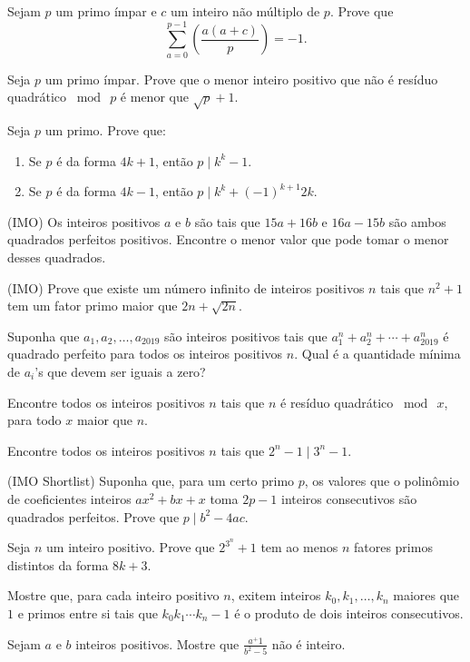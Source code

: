\documentclass[10pt,a4paper]{article}
\newcommand{\leg}[2]{\left(\frac{#1}{#2}\right)}
\newcommand{\tmod}[1]{\bmod{\ #1}}
\begin{document}
	\begin{prob}
		Sejam $p$ um primo ímpar e $c$ um inteiro não múltiplo de $p$. Prove que
		$$\sum_{a = 0}^{p-1}\leg{a(a+c)}{p} = -1.$$
	\end{prob}
	\begin{prob}
		Seja $p$ um primo ímpar. Prove que o menor inteiro positivo que não é resíduo quadrático $\tmod{p}$ é menor que $\sqrt{p} + 1$.
	\end{prob}
	\begin{prob}
		Seja $p$ um primo. Prove que:
		\begin{enumerate}[label = (\alph*)]
			\item Se $p$ é da forma $4k+1$, então $p \mid k^k - 1$.
			\item Se $p$ é da forma $4k-1$, então $p \mid k^k + (-1)^{k+1}2k$.
		\end{enumerate}
	\end{prob}
	\begin{prob}(IMO)
		Os inteiros positivos $a$ e $b$ são tais que $15a + 16b$ e $16a - 15b$ são ambos quadrados perfeitos positivos. Encontre o menor valor que pode tomar o menor desses quadrados.
	\end{prob}
	\begin{prob}(IMO)
		Prove que existe um número infinito de inteiros positivos $n$ tais que $n^2 + 1$ tem um fator primo maior que $2n + \sqrt{2n}$.
	\end{prob}
	\begin{prob}
		Suponha que $a_1, a_2, \dots, a_{2019}$ são inteiros positivos tais que $a_1^n + a_2^n + \cdots + a_{2019}^n$ é quadrado perfeito para todos os inteiros positivos $n$. Qual é a quantidade mínima de $a_i$'s que devem ser iguais a zero?
	\end{prob}
	\begin{prob}
		Encontre todos os inteiros positivos $n$ tais que $n$ é resíduo quadrático $\tmod{x}$, para todo $x$ maior que $n$.
	\end{prob}
	\begin{prob}
		Encontre todos os inteiros positivos $n$ tais que $2^n - 1 \mid 3^n - 1$.
	\end{prob}
	\begin{prob}(IMO Shortlist)
		Suponha que, para um certo primo $p$, os valores que o polinômio de coeficientes inteiros $ax^2 + bx + x$ toma $2p-1$ inteiros consecutivos são quadrados perfeitos. Prove que $p \mid b^2 - 4ac$.
	\end{prob}
	\begin{prob}
		Seja $n$ um inteiro positivo. Prove que $2^{3^n} + 1$ tem ao menos $n$ fatores primos distintos da forma $8k + 3$.
	\end{prob}
	\begin{prob}
		Mostre que, para cada inteiro positivo $n$, exitem inteiros $k_0, k_1, \dots, k_n$ maiores que $1$ e primos entre si tais que $k_0k_1\cdots k_n - 1$ é o produto de dois inteiros consecutivos.
	\end{prob}
	\begin{prob}
		Sejam $a$ e $b$ inteiros positivos. Mostre que $\frac{a^+1}{b^2-5}$ não é inteiro.
	\end{prob}
\end{document}
